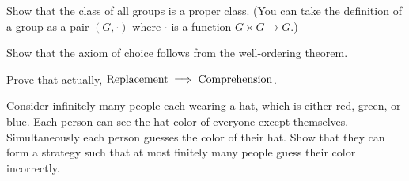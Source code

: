 \begin{problem}
	Show that the class of all groups is a proper class.
	(You can take the definition of a group as a pair $(G, \cdot)$
	where $\cdot$ is a function $G \times G \to G$.)
\end{problem}
\begin{problem}
	Show that the axiom of choice follows from the well-ordering theorem.
\end{problem}

\begin{dproblem}
	Prove that actually, $\mathrm{Replacement} \implies \mathrm{Comprehension}$.
\end{dproblem}

\begin{problem}
	Consider infinitely many people each wearing a hat,
	which is either red, green, or blue.
	Each person can see the hat color of everyone except themselves.
	Simultaneously each person guesses the color of their hat.
	Show that they can form a strategy such that at most finitely many people guess their color incorrectly. 
\end{problem}
